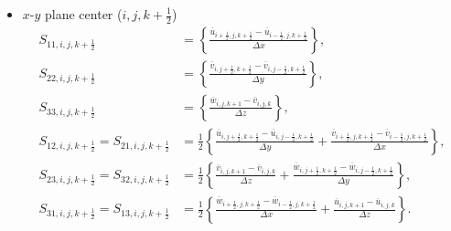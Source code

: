 \begin{itemize}
  \item $x$-$y$ plane center ($i,j,k+\frac{1}{2}$)
    \begin{align}
      S_{11,i,j,k+\frac{1}{2}} &= \left\{
      \frac{\overline{u}_{i+\frac{1}{2},j,k+\frac{1}{2}}-\overline{u}_{i-\frac{1}{2},j,k+\frac{1}{2}}}{\Delta x}
      \right\}, \\
      S_{22,i,j,k+\frac{1}{2}} &= \left\{
      \frac{\overline{v}_{i,j+\frac{1}{2},k+\frac{1}{2}}-\overline{v}_{i,j-\frac{1}{2},k+\frac{1}{2}}}{\Delta y}
      \right\}, \\
      S_{33,i,j,k+\frac{1}{2}} &= \left\{
      \frac{\overline{w}_{i,j,k+1}-\overline{v}_{i,j,k}}{\Delta z}
      \right\}, \\
      S_{12,i,j,k+\frac{1}{2}} = S_{21,i,j,k+\frac{1}{2}} &= \frac{1}{2}\left\{
      \frac{\overline{u}_{i,j+\frac{1}{2},k+\frac{1}{2}}-\overline{u}_{i,j-\frac{1}{2},k+\frac{1}{2}}}{\Delta y}
     +\frac{\overline{v}_{i+\frac{1}{2},j,k+\frac{1}{2}}-\overline{v}_{i-\frac{1}{2},j,k+\frac{1}{2}}}{\Delta x}
      \right\}, \\
      S_{23,i,j,k+\frac{1}{2}} = S_{32,i,j,k+\frac{1}{2}} &= \frac{1}{2}\left\{
      \frac{\overline{v}_{i,j,k+1}-\overline{v}_{i,j,k}}{\Delta z}
     +\frac{\overline{w}_{i,j+\frac{1}{2},k+\frac{1}{2}}-\overline{w}_{i,j-\frac{1}{2},k+\frac{1}{2}}}{\Delta y}
      \right\}, \\
      S_{31,i,j,k+\frac{1}{2}} = S_{13,i,j,k+\frac{1}{2}} &= \frac{1}{2}\left\{
      \frac{\overline{w}_{i+\frac{1}{2},j,k+\frac{1}{2}}-\overline{w}_{i-\frac{1}{2},j,k+\frac{1}{2}}}{\Delta x}
     +\frac{\overline{u}_{i,j,k+1}-\overline{u}_{i,j,k}}{\Delta z}
      \right\}.
    \end{align}


\end{itemize}
